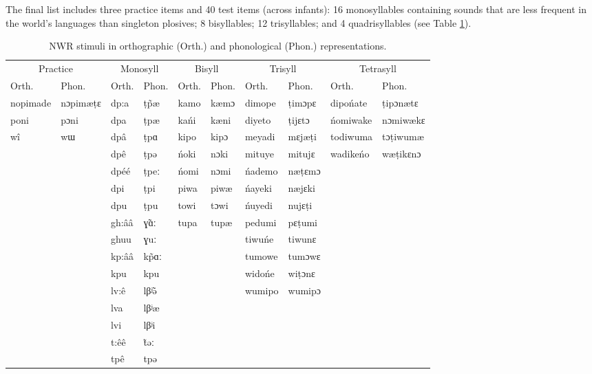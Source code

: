 \documentclass[english,,man,floatsintext]{apa6}
\begin{document}
The final list includes three practice items and 40 test items (across infants): 16 monosyllables containing sounds that are less frequent in the world's languages than singleton plosives; 8 bisyllables; 12 trisyllables; and 4 quadrisyllables (see Table \ref{tab:tabstims}).

\begin{table}

\caption{\label{tab:tabstims}NWR stimuli in orthographic (Orth.) and phonological (Phon.) representations.}
\centering
\begin{tabular}[t]{llllllllll}
\toprule
\multicolumn{2}{c}{Practice} & \multicolumn{2}{c}{Monosyll} & \multicolumn{2}{c}{Bisyll} & \multicolumn{2}{c}{Trisyll} & \multicolumn{2}{c}{Tetrasyll} \\
\cmidrule(l{3pt}r{3pt}){1-2} \cmidrule(l{3pt}r{3pt}){3-4} \cmidrule(l{3pt}r{3pt}){5-6} \cmidrule(l{3pt}r{3pt}){7-8} \cmidrule(l{3pt}r{3pt}){9-10}
Orth. & Phon. & Orth. & Phon. & Orth. & Phon. & Orth. & Phon. & Orth. & Phon.\\
\midrule
nopimade & nɔpimæṭɛ & dp:a & ṭp̃æ & kamo & kæmɔ & dimope & ṭimɔpɛ & dipońate & ṭipɔnætɛ\\
poni & pɔni & dpa & ṭpæ & kańi & kæni & diyeto & ṭijɛtɔ & ńomiwake & nɔmiwækɛ\\
wî & wɯ & dpâ & ṭpɑ & kipo & kipɔ & meyadi & mɛjæṭi & todiwuma & tɔṭiwumæ\\
 &  & dpê & ṭpə & ńoki & nɔki & mituye & mitujɛ & wadikeńo & wæṭikɛnɔ\\
 &  & dpéé & ṭpeː & ńomi & nɔmi & ńademo & næṭɛmɔ &  & \\
\addlinespace
 &  & dpi & ṭpi & piwa & piwæ & ńayeki & næjɛki &  & \\
 &  & dpu & ṭpu & towi & tɔwi & ńuyedi & nujɛṭi &  & \\
 &  & gh:ââ & ɣ̃ɑː & tupa & tupæ & pedumi & pɛṭumi &  & \\
 &  & ghuu & ɣuː &  &  & tiwuńe & tiwunɛ &  & \\
 &  & kp:ââ & kp̃ɑː &  &  & tumowe & tumɔwɛ &  & \\
\addlinespace
 &  & kpu & kpu &  &  & widońe & wiṭɔnɛ &  & \\
 &  & lv:ê & lβʲ̃ə &  &  & wumipo & wumipɔ &  & \\
 &  & lva & lβʲæ &  &  &  &  &  & \\
 &  & lvi & lβʲi &  &  &  &  &  & \\
 &  & t:êê & t̃əː &  &  &  &  &  & \\
\addlinespace
 &  & tpê & tpə &  &  &  &  &  & \\
\bottomrule
\end{tabular}
\end{table}
\end{document}
